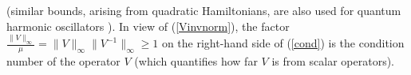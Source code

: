 \documentclass[letterpaper, 10pt, conference]{ieeeconf}  %
\def\<{\leqslant}           %
\def\>{\geqslant}           %
\begin{document}
(similar bounds, arising from quadratic Hamiltonians, are also used for quantum harmonic oscillators \cite[Eq. (22)]{P_2014}).
In view of (\ref{Vinvnorm}), the factor
$
    \frac{\|V\|_\infty}{\mu} = \|V\|_{\infty}\|V^{-1}\|_{\infty}
    \> 1
$
on the right-hand side of (\ref{cond}) is the condition number of the operator $V$ (which quantifies how far $V$ is from scalar operators).



%
%
%
%
%
%
%
%
%
\end{document}

